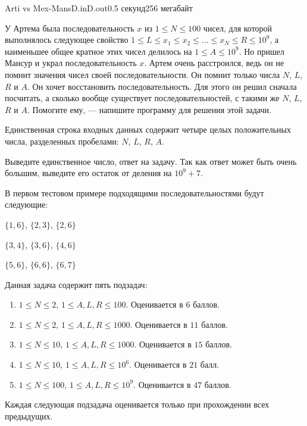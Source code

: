 \begin{problem}{Arti vs Mex-Mans}{D.in}{D.out}{0.5 секунд}{256 мегабайт}

У Артема была последовательность $x$ из $1 \le N \le 100$ чисел, для которой выполнялось следующее свойство $1 \le L \le x_1 \le x_2 \le \ldots \le x_N \le R \le 10^9$, а наименьшее общее кратное этих чисел делилось на $1 \le A \le 10^9$. Но пришел Мансур и украл последовательность $x$. Артем очень расстроился, ведь он не помнит значения чисел своей последовательности. Он помнит только числа $N$, $L$, $R$ и $A$. Он хочет восстановить последовательность. Для этого он решил сначала посчитать, а сколько вообще существует последовательностей, с такими же $N$, $L$, $R$ и $A$. Помогите ему, --- напишите программу для решения этой задачи.

\InputFile
Единственная строка входных данных содержит четыре целых положительных числа, разделенных  пробелами: $N$, $L$, $R$, $A$.

\OutputFile
Выведите единственное число, ответ на задачу. Так как ответ может быть очень большим, выведите его остаток от деления на $10^9 + 7$.

\Examples

\begin{example}
%
%
\end{example}


В первом тестовом примере подходящими последовательностями будут следующие:

$\{ 1, 6\}$, $\{ 2, 3\}$, $\{ 2, 6\}$

$\{ 3, 4\}$, $\{ 3, 6\}$, $\{ 4, 6\}$

$\{ 5, 6\}$, $\{ 6, 6\}$, $\{ 6, 7\}$

\Scoring
Данная задача содержит пять подзадач:
\begin{enumerate}
\item $1 \le N \le 2$, $1 \le A,L,R \le 100$. Оценивается в $6$ баллов.
\item $1 \le N \le 2$, $1 \le A,L,R \le 1000$. Оценивается в $11$ баллов.
\item $1 \le N \le 10$, $1 \le A,L,R \le 1000$. Оценивается в $15$ баллов.
\item $1 \le N \le 10$, $1 \le A,L,R \le 10^6$. Оценивается в $21$ балл.
\item $1 \le N \le 100$, $1 \le A,L,R \le 10^9$. Оценивается в $47$ баллов.
\end{enumerate}

Каждая следующая подзадача оценивается только при прохождении всех предыдущих.

\end{problem}
